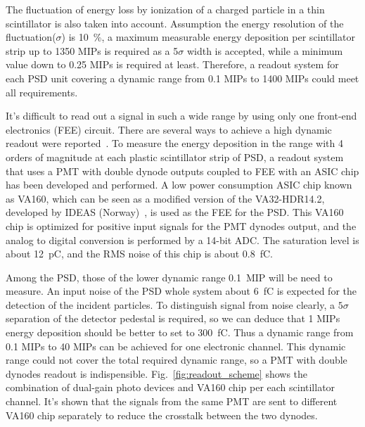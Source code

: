 \documentclass[5p, times]{elsarticle}
\begin{document}
The fluctuation of energy loss by ionization of a charged particle in a thin scintillator is also taken into account.
Assumption the energy resolution of the fluctuation($\sigma$) is \SI{10}{\percent}, a maximum measurable energy deposition per scintillator strip up to 1350 MIPs is required as a 5$\sigma $ width is accepted, while a minimum value down to 0.25 MIPs is required at least. 
Therefore, a readout system for each PSD unit covering a dynamic range from 0.1 MIPs to 1400 MIPs could meet all requirements.

It’s difficult to read out a signal in such a wide range by using only one front-end electronics (FEE) circuit. 
There are several ways to achieve a high dynamic readout were reported~\cite{katayose2008development,kampert1994high,zhang2012high}. 
To measure the energy deposition in the range with 4 orders of magnitude at each plastic scintillator strip of PSD, a readout system that uses a PMT with double dynode outputs coupled to FEE with an ASIC chip has been developed and performed. 
A low power consumption ASIC chip known as VA160, which can be seen as a modified version of the VA32-HDR14.2, developed by IDEAS (Norway)~\cite{va160}, is used as the FEE for the PSD. 
This VA160 chip is optimized for positive input signals for the PMT dynodes output, and the analog to digital conversion is performed by a 14-bit ADC. 
The saturation level is about \SI{12}{\pico\coulomb}, and the RMS noise of this chip is about \SI{0.8}{\femto\coulomb}.

Among the PSD, those of the lower dynamic range \SI{0.1}{MIP} will be need to measure. 
An input noise of the PSD whole system about \SI{6}{\femto\coulomb} is expected for the detection of the incident particles. 
To distinguish signal from noise clearly, a $5\sigma$ separation of the detector pedestal is required, so we can deduce that 1 MIPs energy deposition should be better to set to \SI{300}{\femto\coulomb}. 
Thus a dynamic range from 0.1 MIPs to 40 MIPs can be achieved for one electronic channel.
This dynamic range could not cover the total required dynamic range, so a PMT with double dynodes readout is indispensible. 
Fig.~\ref{fig:readout_scheme} shows the combination of dual-gain photo devices and VA160 chip per each scintillator channel.
It’s shown that the signals from the same PMT are sent to different VA160 chip separately to reduce the crosstalk between the two dynodes.
\end{document}
